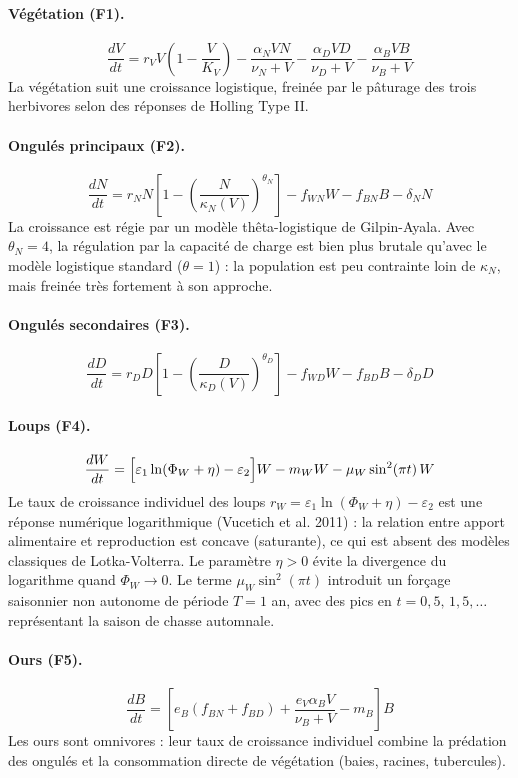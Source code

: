 \documentclass[12pt,a4paper]{article}
\begin{document}
\paragraph{Végétation (F1).}
\[
\frac{dV}{dt} = r_V V\!\left(1 - \frac{V}{K_V}\right)
- \frac{\alpha_N V N}{\nu_N + V}
- \frac{\alpha_D V D}{\nu_D + V}
- \frac{\alpha_B V B}{\nu_B + V}
\]
La végétation suit une croissance logistique, freinée par le pâturage des trois herbivores
selon des réponses de Holling Type II.

\paragraph{Ongulés principaux (F2).}
\[
\frac{dN}{dt} = r_N N\!\left[1 - \left(\frac{N}{\kappa_N(V)}\right)^{\theta_N}\right]
- f_{WN} W - f_{BN} B - \delta_N N
\]
La croissance est régie par un modèle thêta-logistique de Gilpin-Ayala. Avec $\theta_N = 4$,
la régulation par la capacité de charge est bien plus brutale qu'avec le modèle logistique
standard ($\theta = 1$) : la population est peu contrainte loin de $\kappa_N$, mais freinée
très fortement à son approche.

\paragraph{Ongulés secondaires (F3).}
\[
\frac{dD}{dt} = r_D D\!\left[1 - \left(\frac{D}{\kappa_D(V)}\right)^{\theta_D}\right]
- f_{WD} W - f_{BD} B - \delta_D D
\]

\paragraph{Loups (F4).}
\[
\frac{dW}{dt} = \Bigl[\varepsilon_1 \ln(\Phi_W + \eta) - \varepsilon_2\Bigr] W
- m_W W - \mu_W \sin^2(\pi t)\, W
\]
Le taux de croissance individuel des loups $r_W = \varepsilon_1 \ln(\Phi_W + \eta) - \varepsilon_2$
est une réponse numérique logarithmique (Vucetich et al. 2011) : la relation entre apport
alimentaire et reproduction est concave (saturante), ce qui est absent des modèles
classiques de Lotka-Volterra. Le paramètre $\eta > 0$ évite la divergence du logarithme
quand $\Phi_W \to 0$. Le terme $\mu_W \sin^2(\pi t)$ introduit un forçage saisonnier
non autonome de période $T = 1$ an, avec des pics en $t = 0{,}5,\, 1{,}5, \ldots$
représentant la saison de chasse automnale.

\paragraph{Ours (F5).}
\[
\frac{dB}{dt} = \left[e_B\!\left(f_{BN} + f_{BD}\right)
+ \frac{e_V \alpha_B V}{\nu_B + V} - m_B\right] B
\]
Les ours sont omnivores : leur taux de croissance individuel combine la prédation des
ongulés et la consommation directe de végétation (baies, racines, tubercules).
\end{document}
